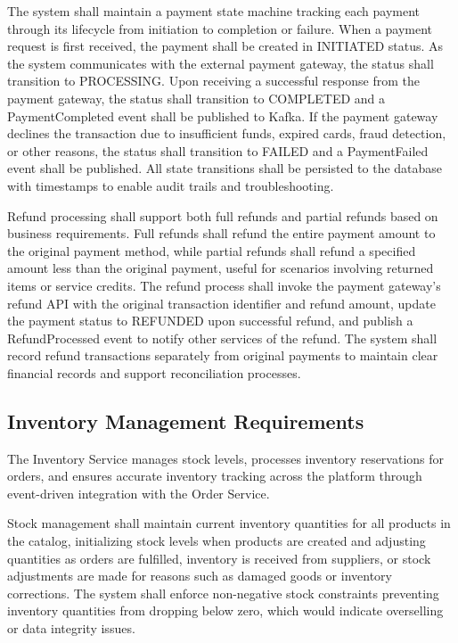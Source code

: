 The system shall maintain a payment state machine tracking each payment through its lifecycle from initiation to completion or failure. When a payment request is first received, the payment shall be created in INITIATED status. As the system communicates with the external payment gateway, the status shall transition to PROCESSING. Upon receiving a successful response from the payment gateway, the status shall transition to COMPLETED and a PaymentCompleted event shall be published to Kafka. If the payment gateway declines the transaction due to insufficient funds, expired cards, fraud detection, or other reasons, the status shall transition to FAILED and a PaymentFailed event shall be published. All state transitions shall be persisted to the database with timestamps to enable audit trails and troubleshooting.

Refund processing shall support both full refunds and partial refunds based on business requirements. Full refunds shall refund the entire payment amount to the original payment method, while partial refunds shall refund a specified amount less than the original payment, useful for scenarios involving returned items or service credits. The refund process shall invoke the payment gateway's refund API with the original transaction identifier and refund amount, update the payment status to REFUNDED upon successful refund, and publish a RefundProcessed event to notify other services of the refund. The system shall record refund transactions separately from original payments to maintain clear financial records and support reconciliation processes.

\subsection{Inventory Management Requirements}

The Inventory Service manages stock levels, processes inventory reservations for orders, and ensures accurate inventory tracking across the platform through event-driven integration with the Order Service.

Stock management shall maintain current inventory quantities for all products in the catalog, initializing stock levels when products are created and adjusting quantities as orders are fulfilled, inventory is received from suppliers, or stock adjustments are made for reasons such as damaged goods or inventory corrections. The system shall enforce non-negative stock constraints preventing inventory quantities from dropping below zero, which would indicate overselling or data integrity issues.

